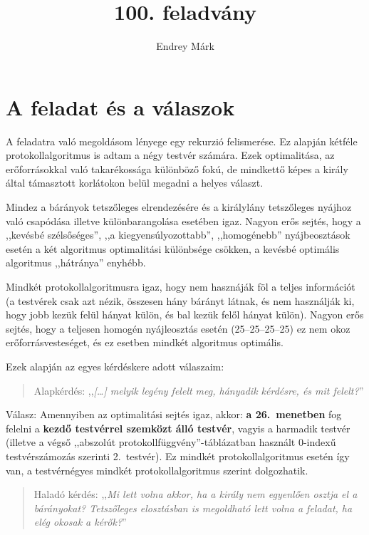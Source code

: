 \documentclass{article}
\title{100. feladvány}
\author{Endrey Márk}
\begin{document}
	\maketitle

	\tableofcontents

	\section{A feladat és a válaszok}

	A feladatra való megoldásom lényege egy rekurzió felismerése. Ez alapján kétféle protokollalgoritmus is adtam a négy testvér számára.
	Ezek optimalitása, az erőforrásokkal való takarékossága különböző fokú, de mindkettő képes a király által támasztott korlátokon belül megadni a helyes választ.

	Mindez a bárányok tetszőleges elrendezésére és a királylány tetszőleges nyájhoz való csapódása illetve különbarangolása esetében igaz.
	Nagyon erős sejtés, hogy a ,,kevésbé szélsőséges'', ,,a kiegyensúlyozottabb'', ,,homogénebb'' nyájbeosztások esetén a két algoritmus optimalitási különbsége csökken, a kevésbé optimális algoritmus ,,hátránya'' enyhébb.

	Mindkét protokollalgoritmusra igaz, hogy nem hasznáják föl a teljes információt (a testvérek csak azt nézik, összesen hány bárányt látnak, és nem használják ki, hogy jobb kezük felül hányat külön, és bal kezük felől hányat külön). Nagyon erős sejtés, hogy a teljesen homogén nyájleosztás esetén (25--25--25--25) ez nem okoz erőforrásvesteséget, és ez esetben mindkét algoritmus optimális.

	Ezek alapján az egyes  kérdéskere adott válaszaim:

	\begin{quotation}
		Alapkérdés: ,,\textit{[\dots] melyik legény felelt meg, hányadik kérdésre, és mit felelt?}''
	\end{quotation}

	Válasz: Amennyiben az optimalitási sejtés igaz, akkor: \textbf{a 26.~menetben} fog felelni a \textbf{kezdő testvérrel szemközt álló testvér}, vagyis a harmadik testvér (illetve a végső ,,abszolút protokollfüggvény''-táblázatban használt 0-indexű testvérszámozás szerinti 2.~testvér). Ez mindkét protokollalgoritmus esetén így van, a testvérnégyes mindkét protokollalgoritmus szerint dolgozhatik.
	
	\begin{quotation}
		Haladó kérdés: ,,\textit{Mi lett volna akkor, ha a király nem egyenlően osztja el a bárányokat? Tetszőleges elosztásban is megoldható lett volna a feladat, ha elég okosak a kérők?}''
	\end{quotation}
\end{document}
